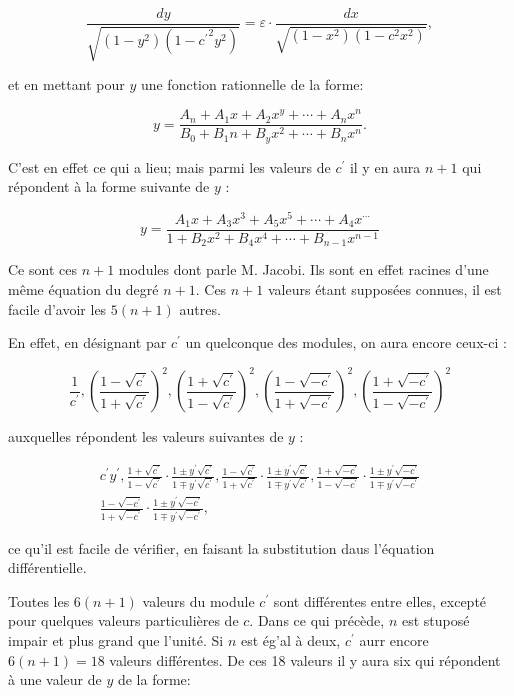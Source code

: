 \documentclass{article}
\begin{document}
\[
\frac{d y}{\sqrt{\left(1-y^{2}\right)\left(1-{c^{\prime}}^{2} y^{2}\right)}}=\varepsilon \cdot \frac{d x}{\sqrt{\left(1-x^{2}\right)\left(1-c^{2} x^{2}\right)}},
\]

et en mettant pour \(y\) une fonction rationnelle de la forme:

\[
y=\frac{A_{n}+A_{1} x+A_{2} x^{y}+\cdots+A_{n} x^{n}}{B_{0}+B_{1} n+B_{y} x^{2}+\cdots+B_{n} x^{n}} .
\]

C'est en effet ce qui a lieu; mais parmi les valeurs de \(c^{\prime}\) il y en aura \(n+1\) qui répondent à la forme suivante de \(y\) :

\[
y=\frac{A_{1} x+A_{3} x^{3}+A_{5} x^{5}+\cdots+A_{4} x^{\cdots}}{1+B_{2} x^{2}+B_{4} x^{4}+\cdots+B_{n-1} x^{n-1}}
\]

Ce sont ces \(n+1\) modules dont parle M. Jacobi. Ils sont en effet racines d'une même équation du degré \(n+1\). Ces \(n+1\) valeurs étant supposées connues, il est facile d'avoir les \(5(n+1)\) autres.

En effet, en désignant par \(c^{\prime}\) un quelconque des modules, on aura encore ceux-ci :

\[
\frac{1}{c^{\prime}},\left(\frac{1-\sqrt{c^{\prime}}}{1+\sqrt{c^{\prime}}}\right)^{2},\left(\frac{1+\sqrt{c^{\prime}}}{1-\sqrt{c^{\prime}}}\right)^{2},\left(\frac{1-\sqrt{-c^{\prime}}}{1+\sqrt{-c^{\prime}}}\right)^{2},\left(\frac{1+\sqrt{-c^{\prime}}}{1-\sqrt{-c^{\prime}}}\right)^{2}
\]

auxquelles répondent les valeurs suivantes de \(y\) :

\[
\begin{gathered}
c^{\prime} y^{\prime}, \frac{1+\sqrt{c^{\prime}}}{1-\sqrt{c^{\prime}}} \cdot \frac{1 \pm y^{\prime} \sqrt{c^{\prime}}}{1 \mp y^{\prime} \sqrt{c^{\prime}}}, \frac{1-\sqrt{c^{\prime}}}{1+\sqrt{c^{\prime}}} \cdot \frac{1 \pm y^{\prime} \sqrt{c^{\prime}}}{1 \mp y^{\prime} \sqrt{c^{\prime}}}, \frac{1+\sqrt{-c^{\prime}}}{1-\sqrt{-c^{\prime}}} \cdot \frac{1 \pm y^{\prime} \sqrt{-c^{\prime}}}{1 \mp y^{\prime} \sqrt{-c^{\prime}}} \\
\frac{1-\sqrt{-c^{\prime}}}{1+\sqrt{-c^{\prime}}} \cdot \frac{1 \pm y^{\prime} \sqrt{-c^{\prime}}}{1 \mp y^{\prime} \sqrt{-c^{\prime}}},
\end{gathered}
\]

ce qu'il est facile de vérifier, en faisant la substitution daus l'équation différentielle.

Toutes les \(6(n+1)\) valeurs du module \(c^{\prime}\) sont différentes entre elles, excepté pour quelques valeurs particulières de \(c\). Dans ce qui précède, \(n\) est stuposé impair et plus grand que l'unité. Si \(n\) est ég'al à deux, \(c^{\prime}\) aurr encore \(6(n+1)=18\) valeurs différentes. De ces 18 valeurs il y aura six qui répondent à une valeur de \(y\) de la forme:
\end{document}
